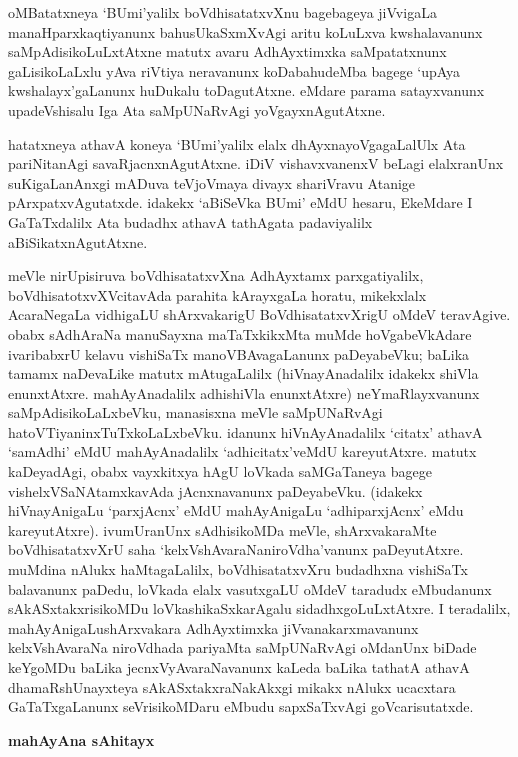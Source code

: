 oMBatatxneya `BUmi'yalilx boVdhisatatxvXnu bagebageya jiVvigaLa manaHparxkaqti\-yanunx bahusUkaSxmXvAgi aritu koLuLxva kwshalavanunx saMpAdisikoLuLxtAtxne matutx avaru AdhAyxtimxka saMpatatxnunx gaLisikoLaLxlu yAva riVtiya neravanunx koDabahudeMba bagege `upAya kwshalayx'gaLanunx huDukalu toDagutAtxne. eMdare parama satayxvanunx upadeVshisalu Iga Ata saMpUNaRvAgi yoVgayxnAgutAtxne.

hatatxneya athavA koneya `BUmi'yalilx elalx dhAyxnayoVgagaLalUlx Ata pariNitanAgi savaRjacnxnAgutAtxne. iDiV vishavxvanenxV beLagi elalxranUnx suKigaLanAnxgi mADuva teVjoVmaya divayx shariVravu Atanige pArxpatxvAgutatxde. idakekx `aBiSeVka BUmi' eMdU hesaru, EkeMdare I GaTaTxdalilx Ata budadhx athavA tathAgata padaviyalilx aBiSikatxnAgutAtxne.

meVle nirUpisiruva boVdhisatatxvXna AdhAyxtamx parxgatiyalilx, boVdhisatotxvXVcitavAda parahita kArayxgaLa horatu, mikekxlalx AcaraNegaLa vidhigaLU shArxvakarigU BoVdhisatatxvXrigU oMdeV teravAgive. obabx sAdhAraNa manuSayxna maTaTxkikxMta muMde hoVgabeVkAdare ivaribabxrU kelavu vishiSaTx manoVBAvagaLanunx paDeyabeVku; baLika tamamx naDevaLike matutx mAtugaLalilx (hiVnayAnadalilx idakekx shiVla enunxtAtxre. mahAyAnadalilx adhi\-shiVla enunxtAtxre) neYmaRlayxvanunx saMpAdisikoLaLxbeVku, manasisxna meVle saMpUNaR\-vAgi hatoVTiyaninxTuTxkoLaLxbeVku. idanunx hiVnAyAnadalilx `citatx' athavA `samAdhi' eMdU mahAyAnadalilx `adhicitatx'veMdU kareyutAtxre. matutx kaDeyadAgi, obabx vayxkitxya hAgU loVkada saMGaTaneya bagege vishelxVSaNAtamxkavAda jAcnxnavanunx paDeyabeVku. (idakekx hiVnayAni\break\-gaLu `parxjAcnx' eMdU mahAyAnigaLu `adhiparxjAcnx' eMdu kareyutAtxre). ivu\break mUranUnx sAdhisikoMDa meVle, shArxvakaraMte boVdhisatatxvXrU saha `kelxVshAvaraNa\break niroVdha'vanunx paDeyutAtxre. muMdina nAlukx haMtagaLalilx, boVdhisatatxvXru \hbox{budadhxna} vishiSaTx balavanunx paDedu, loVkada elalx vasutxgaLU oMdeV taradudx eMbudanunx sAkASx\break\-takxrisikoMDu loVkashikaSxkarAgalu sidadhxgoLuLxtAtxre. I teradalilx, mahAyAnigaLu\break shArxvakara AdhAyxtimxka jiVvanakarxmavanunx kelxVshAvaraNa niroVdhada pariyaMta saMpUNaR\-vAgi oMdanUnx biDade keYgoMDu baLika jecnxVyAvaraNavanunx kaLeda baLika tathatA athavA dhamaRshUnayxteya sAkASxtakxraNakAkxgi mikakx nAlukx ucacxtara GaTaTxgaLanunx seVrisikoMDaru eMbudu sapxSaTxvAgi goVcarisutatxde.

\begin{center}
{\textbf{\Large mahAyAna sAhitayx}}
\end{center}

